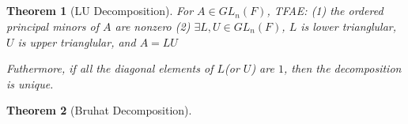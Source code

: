 \documentclass{book}
\newtheorem{theorem}{Theorem}[section]
\theoremstyle{definition}
\begin{document}
\subsection{}
\begin{theorem}[LU Decomposition]
    For $A\in GL_n(F)$, TFAE:
    (1) the ordered principal minors of $A$ are nonzero
    (2) $\exists L,U\in GL_n(F)$, $L$ is lower trianglular, $U$ is upper trianglular, and $A=LU$\par
    Futhermore, if all the diagonal elements of $L$(or $U$) are $1$, then the decomposition is unique.
    
\end{theorem}

\begin{theorem}[Bruhat Decomposition]

    
\end{theorem}
\end{document}
